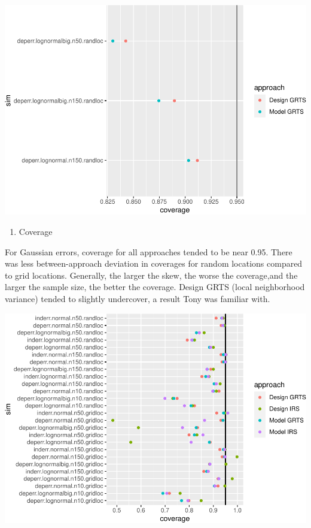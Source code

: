 \documentclass[]{elsarticle} %
\providecommand{\tightlist}{%
  \setlength{\itemsep}{0pt}\setlength{\parskip}{0pt}}
\begin{document}
\includegraphics{SpatialDVM_Manuscript_files/figure-latex/unnamed-chunk-6-1.pdf}

\begin{enumerate}
\def\labelenumi{\arabic{enumi}.}
\setcounter{enumi}{3}
\tightlist
\item
  Coverage
\end{enumerate}

For Gaussian errors, coverage for all approaches tended to be near 0.95.
There was less between-approach deviation in coverages for random
locations compared to grid locations. Generally, the larger the skew,
the worse the coverage,and the larger the sample size, the better the
coverage. Design GRTS (local neighborhood variance) tended to slightly
undercover, a result Tony was familiar with.

\includegraphics{SpatialDVM_Manuscript_files/figure-latex/unnamed-chunk-7-1.pdf}
\end{document}

